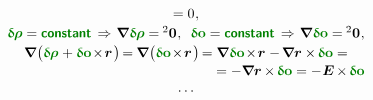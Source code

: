 \begin{equation*}
\begin{array}{c}
= 0 \hspace{.1ex} ,
\\[.2em]
%
\constvarvector{\hspace{-0.1ex}\bm{\rho}} = \boldconstant
\hspace{.4ex} \Rightarrow \hspace{.2ex}
\boldnabla \hspace{.1ex} \constvarvector{\hspace{-0.1ex}\bm{\rho}} =  \hspace{-0.12ex} \zerobivalent \hspace{.1ex} ,
\;\:
\constvarvector{o} = \boldconstant
\hspace{.4ex} \Rightarrow \hspace{.2ex}
\boldnabla \hspace{.1ex} \constvarvector{o} = \hspace{-0.12ex} \zerobivalent \hspace{.1ex} ,
\\[.2em]
%
\boldnabla \hspace{.1ex} \bigl(
\constvarvector{\hspace{-0.1ex}\bm{\rho}} \hspace{.1ex} +
\constvarvector{o} \hspace{-0.33ex} \times \hspace{-0.33ex} \currentlocationvector \hspace{.2ex} \bigr) \hspace{-0.25ex}
= \hspace{-0.1ex} \boldnabla \hspace{.1ex} \bigl(
\constvarvector{o} \hspace{-0.33ex} \times \hspace{-0.33ex} \currentlocationvector \hspace{.2ex} \bigr) \hspace{-0.25ex}
= \boldnabla \hspace{.1ex} \constvarvector{o} \hspace{-0.33ex} \times \hspace{-0.33ex} \currentlocationvector
\hspace{.1ex} - \hspace{-0.2ex}
\boldnabla \currentlocationvector \times \hspace{-0.2ex} \constvarvector{o} =
\\[.1em] %
\hspace*{\fill}
= - \boldnabla \currentlocationvector \hspace{-0.1ex} \times \hspace{-0.2ex} \constvarvector{o}
= - \hspace{.1ex} \UnitDyad \hspace{-0.16ex} \times \hspace{-0.2ex} \constvarvector{o}
\\[.2em]
%
\cdots
\end{array}
\end{equation*}

